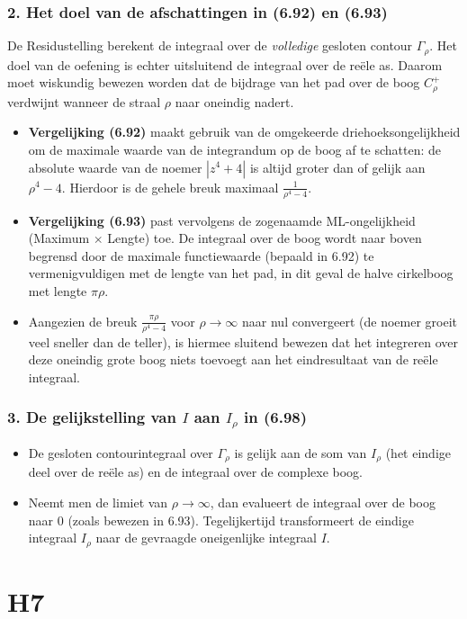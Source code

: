 \documentclass[a4paper,twoside]{article}
\theoremstyle{definition}
\theoremstyle{plain}
\begin{document}
\subsubsection*{2. Het doel van de afschattingen in (6.92) en (6.93)}
De Residustelling berekent de integraal over de \textit{volledige} gesloten contour $\Gamma_\rho$. Het doel van de oefening is echter uitsluitend de integraal over de reële as. Daarom moet wiskundig bewezen worden dat de bijdrage van het pad over de boog $C_\rho^+$ verdwijnt wanneer de straal $\rho$ naar oneindig nadert.
\begin{itemize}
    \item \textbf{Vergelijking (6.92)} maakt gebruik van de omgekeerde driehoeksongelijkheid om de maximale waarde van de integrandum op de boog af te schatten: de absolute waarde van de noemer $|z^4 + 4|$ is altijd groter dan of gelijk aan $\rho^4 - 4$. Hierdoor is de gehele breuk maximaal $\frac{1}{\rho^4 - 4}$.
    \item \textbf{Vergelijking (6.93)} past vervolgens de zogenaamde ML-ongelijkheid (Maximum $\times$ Lengte) toe. De integraal over de boog wordt naar boven begrensd door de maximale functiewaarde (bepaald in 6.92) te vermenigvuldigen met de lengte van het pad, in dit geval de halve cirkelboog met lengte $\pi \rho$.
    \item Aangezien de breuk $\frac{\pi \rho}{\rho^4 - 4}$ voor $\rho \to \infty$ naar nul convergeert (de noemer groeit veel sneller dan de teller), is hiermee sluitend bewezen dat het integreren over deze oneindig grote boog niets toevoegt aan het eindresultaat van de reële integraal.
\end{itemize}

\subsubsection*{3. De gelijkstelling van $I$ aan $I_\rho$ in (6.98)}
\begin{itemize}
    \item De gesloten contourintegraal over $\Gamma_\rho$ is gelijk aan de som van $I_\rho$ (het eindige deel over de reële as) en de integraal over de complexe boog.
    \item Neemt men de limiet van $\rho \to \infty$, dan evalueert de integraal over de boog naar $0$ (zoals bewezen in 6.93). Tegelijkertijd transformeert de eindige integraal $I_\rho$ naar de gevraagde oneigenlijke integraal $I$.
\end{itemize}

\section{H7}
\end{document}

